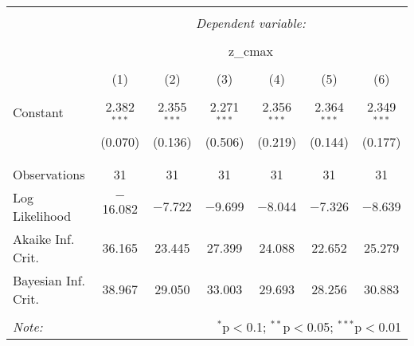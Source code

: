 \documentclass{article}\usepackage[]{graphicx}\usepackage[]{color}
\begin{document}
\begin{table}[!htbp] \centering 
  \caption{} 
  \label{} 
\begin{tabular}{@{\extracolsep{5pt}}lcccccc} 
\\[-1.8ex]\hline 
\hline \\[-1.8ex] 
 & \multicolumn{6}{c}{\textit{Dependent variable:}} \\ 
\cline{2-7} 
\\[-1.8ex] & \multicolumn{6}{c}{z\_cmax} \\ 
\\[-1.8ex] & (1) & (2) & (3) & (4) & (5) & (6)\\ 
\hline \\[-1.8ex] 
 Constant & 2.382$^{***}$ & 2.355$^{***}$ & 2.271$^{***}$ & 2.356$^{***}$ & 2.364$^{***}$ & 2.349$^{***}$ \\ 
  & (0.070) & (0.136) & (0.506) & (0.219) & (0.144) & (0.177) \\ 
  & & & & & & \\ 
\hline \\[-1.8ex] 
Observations & 31 & 31 & 31 & 31 & 31 & 31 \\ 
Log Likelihood & $-$16.082 & $-$7.722 & $-$9.699 & $-$8.044 & $-$7.326 & $-$8.639 \\ 
Akaike Inf. Crit. & 36.165 & 23.445 & 27.399 & 24.088 & 22.652 & 25.279 \\ 
Bayesian Inf. Crit. & 38.967 & 29.050 & 33.003 & 29.693 & 28.256 & 30.883 \\ 
\hline 
\hline \\[-1.8ex] 
\textit{Note:}  & \multicolumn{6}{r}{$^{*}$p$<$0.1; $^{**}$p$<$0.05; $^{***}$p$<$0.01} \\ 
\end{tabular} 
\end{table} 
\end{document}
